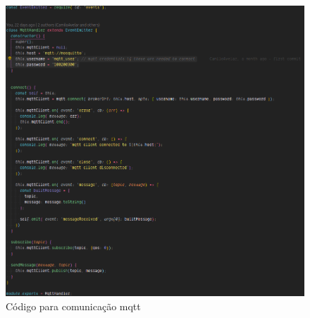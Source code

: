 \begin{figure}[htbp]
	\centering
	\includegraphics[width=1\linewidth]{figuras/mqttlogger/mqtt.png}
	\caption{Código para comunicação mqtt}
	\label{fig:mqtt}
\end{figure}

